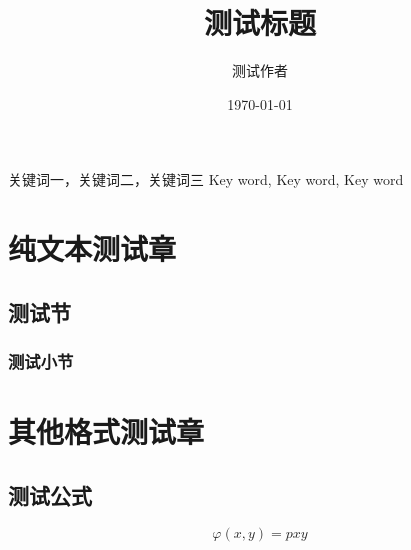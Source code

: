 \documentclass{psythesis}
\title{测试标题}
\author{测试作者}
\date{\today}
\begin{document}
    \maketitle
    \zhabstract{\zhlipsum[1-3][name=xiangyu]}
        {关键词一，关键词二，关键词三}
        {Key word, Key word, Key word}
    
    \PSYtableofcontents

    \section{纯文本测试章}
    \zhlipsum[1][name=xiangyu]
    \subsection{测试节}
    \zhlipsum[2][name=xiangyu]
    \subsubsection{测试小节}
    \zhlipsum[3-8][name=xiangyu]
    
    \section{其他格式测试章}
    \subsection{测试公式}
    \zhlipsum[1]
    \[
        \varphi(x, y) = pxy
    \]
\end{document}
